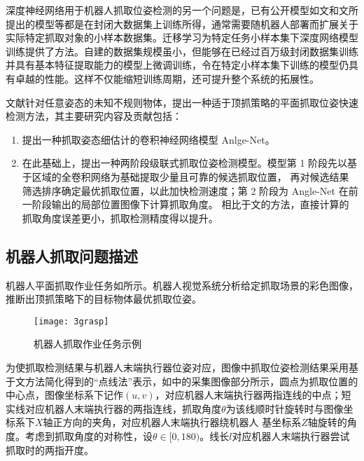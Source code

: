 \documentclass{yangthesis}
\begin{document}
深度神经网络用于机器人抓取位姿检测的另一个问题是，已有公开模型如文\cite{bibb7}和文\cite{bibb11}所提出的模型等都是在封闭大数据集上训练所得，通常需要随机器人部署而扩展关于实际特定抓取对象的小样本数据集。迁移学习为特定任务小样本集下深度网络模型训练提供了方法。自建的数据集规模虽小，但能够在已经过百万级封闭数据集训练并具有基本特征提取能力的模型上微调训练，令在特定小样本集下训练的模型仍具有卓越的性能。这样不仅能缩短训练周期，还可提升整个系统的拓展性。

文献\cite{bib:three}针对任意姿态的未知不规则物体，提出一种适于顶抓策略的平面抓取位姿快速检测方法，其主要研究内容及贡献包括：

\begin{enumerate}[fullwidth, label=(\arabic*), itemindent=2em]
\item 提出一种抓取姿态细估计的卷积神经网络模型 Anlge-Net。

\item 在此基础上，提出一种两阶段级联式抓取位姿检测模型。模型第 1 阶段先以基于区域的全卷积网络为基础提取少量且可靠的候选抓取位置， 再对候选结果筛选排序确定最优抓取位置，以此加快检测速度；第 2 阶段为 Angle-Net 在前一阶段输出的局部位置图像下计算抓取角度。 相比于文\cite{bibb9}的方法，直接计算的抓取角度误差更小，抓取检测精度得以提升。
\end{enumerate}

\subsection{机器人抓取问题描述}

机器人平面抓取作业任务如所示。机器人视觉系统分析给定抓取场景的彩色图像，推断出顶抓策略下的目标物体最优抓取位姿。

\begin{figure}[!htbp]
	\centering
	\texttt{[image: 3grasp]}
	\caption{机器人抓取作业任务示例}
     \label{figgrasp}
\end{figure}

为使抓取检测结果与机器人末端执行器位姿对应，图像中抓取位姿检测结果采用基于文\cite{bibb4}方法简化得到的“点线法”表示，如中的采集图像部分所示，圆点为抓取位置的中心点，图像坐标系下记作$(u, v)$，对应机器人末端执行器两指连线的中点；短实线对应机器人末端执行器的两指连线，抓取角度$\theta$为该线顺时针旋转时与图像坐标系下$X$轴正方向的夹角，对应机器人末端执行器绕机器人 基坐标系$Z$轴旋转的角度。考虑到抓取角度的对称性，设$\theta\in [0, 180)$。线长$l$对应机器人末端执行器尝试抓取时的两指开度。
\end{document}
